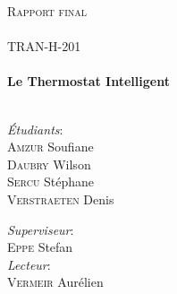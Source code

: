 \documentclass[11pt,a4paper,11pt]{report}
\begin{document}
\begin{titlepage}
\textsc{\Large Rapport final}\\%
\emph{} \\
\textsc{\large TRAN-H-201}\\[1.5cm] %


\HRule \\[1cm]
{ \huge \bfseries \og Le Thermostat Intelligent \fg}\\[1cm] %
\HRule \\[2cm]
 


\begin{minipage}[]{0.4\textwidth}
    \begin{center}
        {\large \textit{Étudiants}:\vspace*{0.5cm} \\
        \textsc{Amzur} Soufiane\\
        \textsc{Daubry} Wilson\\
        \textsc{Sercu} Stéphane\\
        \textsc{Verstraeten} Denis\\ 
        }
    \end{center}
\end{minipage}%
%
\begin{minipage}[]{0.4\textwidth}
    \begin{center}
        {\large \textit{Superviseur}:\vspace*{0.5cm} \\ 
        \textsc{Eppe} Stefan}\\
        \vspace*{0.5cm}
        {\large \textit{Lecteur}:\vspace*{0.5cm} \\ 
        \textsc{Vermeir} Aurélien }\\
    \end{center}    
\end{minipage}


\end{titlepage}
\end{document}
